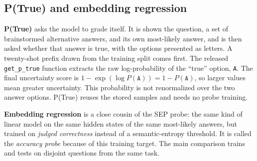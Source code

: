 \subsection{P(True) and embedding regression}
\label{sec:other-estimators}

\textbf{P(True)} asks the model to grade itself. It is shown the question, a
set of brainstormed alternative answers, and its own most-likely answer, and is
then asked whether that answer is true, with the options presented as letters.
A twenty-shot prefix drawn from the training split comes first. The released
\texttt{get\_p\_true} function extracts the raw log-probability of the
``true'' option, \texttt{A}. The final uncertainty score is
$1-\exp(\log P(\texttt{A})) = 1-P(\texttt{A})$, so larger values mean
greater uncertainty. This probability is not renormalized over the two answer
options.
P(True) reuses the stored samples and needs no probe training.

\textbf{Embedding regression} is a close cousin of the SEP probe: the same kind
of linear model on the same hidden states of the same most-likely answers, but
trained on \emph{judged correctness} instead of a semantic-entropy threshold.
It is called the \emph{accuracy probe} because of this training target.
The main comparison trains and tests on disjoint questions from the same task.
